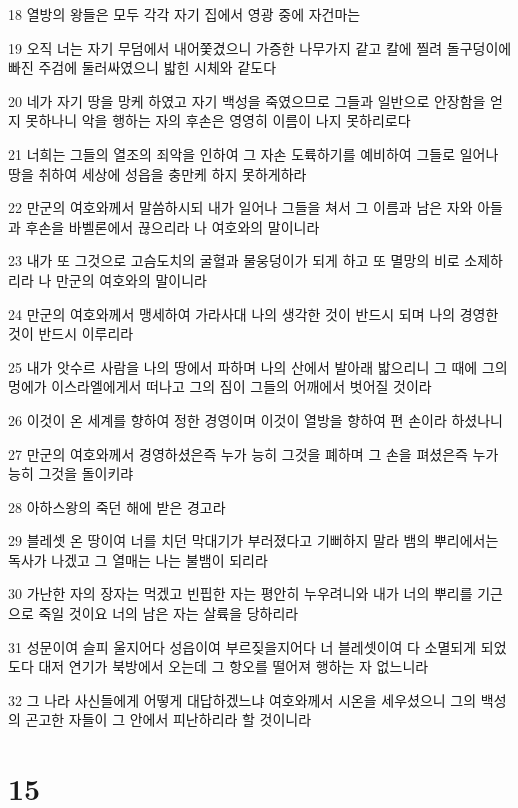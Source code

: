 \par 18 열방의 왕들은 모두 각각 자기 집에서 영광 중에 자건마는
\par 19 오직 너는 자기 무덤에서 내어쫓겼으니 가증한 나무가지 같고 칼에 찔려 돌구덩이에 빠진 주검에 둘러싸였으니 밟힌 시체와 같도다
\par 20 네가 자기 땅을 망케 하였고 자기 백성을 죽였으므로 그들과 일반으로 안장함을 얻지 못하나니 악을 행하는 자의 후손은 영영히 이름이 나지 못하리로다
\par 21 너희는 그들의 열조의 죄악을 인하여 그 자손 도륙하기를 예비하여 그들로 일어나 땅을 취하여 세상에 성읍을 충만케 하지 못하게하라
\par 22 만군의 여호와께서 말씀하시되 내가 일어나 그들을 쳐서 그 이름과 남은 자와 아들과 후손을 바벨론에서 끊으리라 나 여호와의 말이니라
\par 23 내가 또 그것으로 고슴도치의 굴혈과 물웅덩이가 되게 하고 또 멸망의 비로 소제하리라 나 만군의 여호와의 말이니라
\par 24 만군의 여호와께서 맹세하여 가라사대 나의 생각한 것이 반드시 되며 나의 경영한 것이 반드시 이루리라
\par 25 내가 앗수르 사람을 나의 땅에서 파하며 나의 산에서 발아래 밟으리니 그 때에 그의 멍에가 이스라엘에게서 떠나고 그의 짐이 그들의 어깨에서 벗어질 것이라
\par 26 이것이 온 세계를 향하여 정한 경영이며 이것이 열방을 향하여 편 손이라 하셨나니
\par 27 만군의 여호와께서 경영하셨은즉 누가 능히 그것을 폐하며 그 손을 펴셨은즉 누가 능히 그것을 돌이키랴
\par 28 아하스왕의 죽던 해에 받은 경고라
\par 29 블레셋 온 땅이여 너를 치던 막대기가 부러졌다고 기뻐하지 말라 뱀의 뿌리에서는 독사가 나겠고 그 열매는 나는 불뱀이 되리라
\par 30 가난한 자의 장자는 먹겠고 빈핍한 자는 평안히 누우려니와 내가 너의 뿌리를 기근으로 죽일 것이요 너의 남은 자는 살륙을 당하리라
\par 31 성문이여 슬피 울지어다 성읍이여 부르짖을지어다 너 블레셋이여 다 소멸되게 되었도다 대저 연기가 북방에서 오는데 그 항오를 떨어져 행하는 자 없느니라
\par 32 그 나라 사신들에게 어떻게 대답하겠느냐 여호와께서 시온을 세우셨으니 그의 백성의 곤고한 자들이 그 안에서 피난하리라 할 것이니라

\chapter{15}

